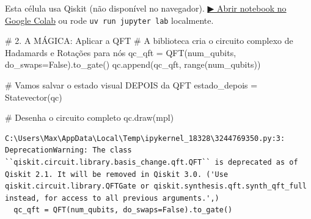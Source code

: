 \documentclass[
  brazilian,
]{report}
\newenvironment{Shaded}{\begin{snugshade}}{\end{snugshade}}
\newcommand{\BuiltInTok}[1]{\textcolor[rgb]{0.00,0.23,0.31}{#1}}
\newcommand{\CommentTok}[1]{\textcolor[rgb]{0.37,0.37,0.37}{#1}}
\newcommand{\NormalTok}[1]{\textcolor[rgb]{0.00,0.23,0.31}{#1}}
\newcommand{\OperatorTok}[1]{\textcolor[rgb]{0.37,0.37,0.37}{#1}}
\newcommand{\StringTok}[1]{\textcolor[rgb]{0.13,0.47,0.30}{#1}}
\newcommand{\VariableTok}[1]{\textcolor[rgb]{0.07,0.07,0.07}{#1}}
\begin{document}
\begin{tcolorbox}[enhanced jigsaw, arc=.35mm, bottomrule=.15mm, bottomtitle=1mm, breakable, colback=white, colbacktitle=quarto-callout-warning-color!10!white, colframe=quarto-callout-warning-color-frame, coltitle=black, left=2mm, leftrule=.75mm, opacityback=0, opacitybacktitle=0.6, rightrule=.15mm, title=\textcolor{quarto-callout-warning-color}{\faExclamationTriangle}\hspace{0.5em}{⚛️ Célula Qiskit --- execute no Colab ou localmente}, titlerule=0mm, toprule=.15mm, toptitle=1mm]

Esta célula usa Qiskit (não disponível no navegador).
\href{https://colab.research.google.com/github/maxwellamaral/aula-quantum/blob/main/notebooks/07-quantum-fourier-transform.ipynb}{▶
Abrir notebook no Google Colab} ou rode \texttt{uv\ run\ jupyter\ lab}
localmente.

\begin{Shaded}
\begin{Highlighting}[]


\CommentTok{\# 2. A MÁGICA: Aplicar a QFT}
\CommentTok{\# A biblioteca cria o circuito complexo de Hadamards e Rotações para nós}
\NormalTok{qc\_qft }\OperatorTok{=}\NormalTok{ QFT(num\_qubits, do\_swaps}\OperatorTok{=}\VariableTok{False}\NormalTok{).to\_gate()}
\NormalTok{qc.append(qc\_qft, }\BuiltInTok{range}\NormalTok{(num\_qubits))}

\CommentTok{\# Vamos salvar o estado visual DEPOIS da QFT}
\NormalTok{estado\_depois }\OperatorTok{=}\NormalTok{ Statevector(qc)}

\CommentTok{\# Desenha o circuito completo}
\NormalTok{qc.draw(}\StringTok{\textquotesingle{}mpl\textquotesingle{}}\NormalTok{) }
\end{Highlighting}
\end{Shaded}

\end{tcolorbox}

\begin{verbatim}
C:\Users\Max\AppData\Local\Temp\ipykernel_18328\3244769350.py:3: DeprecationWarning: The class ``qiskit.circuit.library.basis_change.qft.QFT`` is deprecated as of Qiskit 2.1. It will be removed in Qiskit 3.0. ('Use qiskit.circuit.library.QFTGate or qiskit.synthesis.qft.synth_qft_full instead, for access to all previous arguments.',)
  qc_qft = QFT(num_qubits, do_swaps=False).to_gate()
\end{verbatim}
\end{document}

